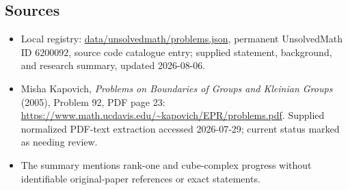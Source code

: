 \documentclass[11pt]{article}
\begin{document}
\subsection{Sources}
\begin{itemize}
\item Local registry: \url{data/unsolvedmath/problems.json}, permanent UnsolvedMath ID \(6200092\), source code catalogue entry; supplied statement, background, and research summary, updated 2026-08-06.
\item Misha Kapovich, \emph{Problems on Boundaries of Groups and Kleinian Groups} (2005), Problem 92, PDF page 23: \url{https://www.math.ucdavis.edu/~kapovich/EPR/problems.pdf}. Supplied normalized PDF-text extraction accessed 2026-07-29; current status marked as needing review.
\item The summary mentions rank-one and cube-complex progress without identifiable original-paper references or exact statements.
\end{itemize}
\end{document}
